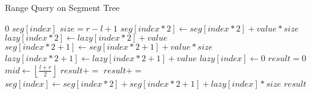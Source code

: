 \begin{algorithm}
    \caption{Range Query on Segment Tree }
    \begin{algorithmic}
                \State \Return $0$
                \State \Return $seg[index]$
            \Else
                \State $size = r - l + 1$
                \State $seg[index*2] \gets {seg[index*2] + value*size}$ 
                \State $lazy[index*2] \gets {lazy[index*2] + value}$ 
                \State $seg[index*2+1] \gets {seg[index*2+1] + value*size}$ 
                \State $lazy[index*2+1] \gets {lazy[index*2+1] + value}$ 
                \State $lazy[index] \gets {0}$ 
                \State $result = 0$
                \State $mid \gets \left\lfloor \frac{l + r}{2} \right\rfloor$
                \State $result +=$ 
                \State $result +=$ 
                \State $seg[index] \gets {seg[index*2] + seg[index*2+1] + lazy[index]*size}$
                \State \Return $result$
            \EndIf
        \EndProcedure
    \end{algorithmic}
\end{algorithm}